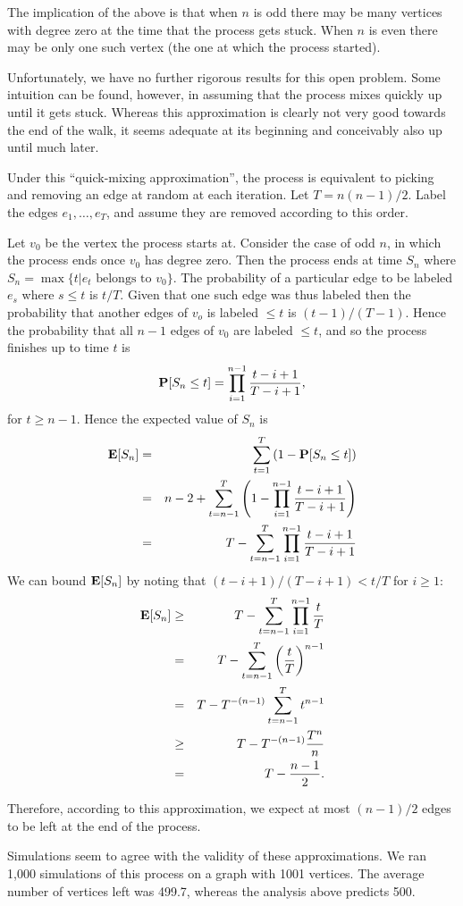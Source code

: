 \documentclass[11pt]{article} \usepackage{amssymb}
\newcommand{\E}{{\bf E}} \newcommand{\Cov}{{\bf Cov}}
\begin{document}
\begin{enumerate}
  The implication of the above is that when $n$ is odd there may be many
  vertices with degree zero at the time that the process gets stuck. When $n$
  is even there may be only one such vertex (the one at which the process
  started).
  
  Unfortunately, we have no further rigorous results for this open problem. 
  Some 
  intuition can be found, however, in assuming that the process mixes quickly
  up until it gets stuck. Whereas this approximation is clearly not very good
  towards the end of the walk, it seems adequate at its beginning and 
  conceivably also up until much later. 

  Under this ``quick-mixing approximation'', 
  the process is equivalent to picking and removing an edge at random at
  each iteration. Let $T=n(n-1)/2$. Label the edges $e_1,\ldots,e_T$, 
  and assume they are removed according to this order. 

  Let $v_0$ be the vertex the process starts at. Consider the case of odd $n$, 
  in which the process ends once $v_0$ has degree zero. Then the process ends
  at time $S_n$ where $S_n=\max\{t|e_t\mbox{ belongs to } v_0\}$. The probability of a particular
  edge to be labeled $e_s$ where $s\leq t$ is $t/T$. Given that one such edge was thus
  labeled then the probability that another edges of $v_o$ is labeled $\leq t$
  is $(t-1)/(T-1)$. Hence the probability
  that all $n-1$ edges of $v_0$ are labeled $\leq t$, and so the process finishes
  up to time $t$ is 
  \begin{equation*}
    \P[S_n\leq t] = \prod_{i=1}^{n-1}{t-i+1\over T-i + 1},
  \end{equation*}
  for $t\geq n-1$. Hence the expected value of $S_n$ is
  \begin{eqnarray*}
    \E[S_n]&=& \sum_{t=1}^T\left(1-\P[S_n\leq t]\right)
    \\ &=&n-2+\sum_{t=n-1}^T\left(1-\prod_{i=1}^{n-1}{t-i+1\over T-i + 1}\right)
    \\ &=& T - \sum_{t=n-1}^T\prod_{i=1}^{n-1}{t-i+1\over T-i + 1}
  \end{eqnarray*}
  We can bound $\E[S_n]$ by noting that $(t-i+1)/(T-i+1)<t/T$ for $i\geq 1$:
  \begin{eqnarray*}
    \E[S_n] &\geq&T - \sum_{t=n-1}^T\prod_{i=1}^{n-1}{t\over T}
    \\ &=& T - \sum_{t=n-1}^T\left({t\over T}\right)^{n-1}
    \\ &=& T - T^{-(n-1)}\sum_{t=n-1}^Tt^{n-1}
    \\ &\geq& T - T^{-(n-1)}{T^n \over n}
    \\ &=& T-{n-1\over 2}.
  \end{eqnarray*}
  
  Therefore, according to this approximation, we expect at most 
  $(n-1)/2$ edges to be left at the end of the process. 
 
  Simulations seem to agree with the validity of these approximations. We ran
  1,000 simulations of this process on a graph with 1001 vertices. The average
  number of vertices left was 499.7, whereas the analysis above predicts 500.

  
\end{enumerate}
\end{document}
